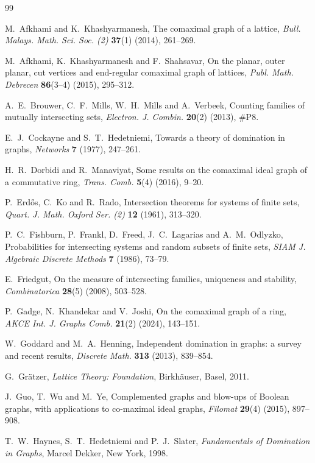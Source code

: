 \documentclass[11pt]{amsart}
\theoremstyle{definition}
\theoremstyle{remark}
\begin{document}
\begin{thebibliography}{99}

 M.~Afkhami and K.~Khashyarmanesh, The comaximal graph of a lattice,
\emph{Bull. Malays. Math. Sci. Soc. (2)} \textbf{37}(1) (2014), 261--269.

 M.~Afkhami, K.~Khashyarmanesh and F.~Shahsavar, On the planar, outer planar, cut
vertices and end-regular comaximal graph of lattices, \emph{Publ. Math. Debrecen} \textbf{86}(3--4)
(2015), 295--312.

 A.~E.~Brouwer, C.~F.~Mills, W.~H.~Mills and A.~Verbeek, Counting families of
mutually intersecting sets, \emph{Electron. J. Combin.} \textbf{20}(2) (2013), \#P8.

 E.~J.~Cockayne and S.~T.~Hedetniemi, Towards a theory of domination in graphs,
\emph{Networks} \textbf{7} (1977), 247--261.

 H.~R.~Dorbidi and R.~Manaviyat, Some results on the comaximal ideal graph of a
commutative ring, \emph{Trans. Comb.} \textbf{5}(4) (2016), 9--20.

 P.~Erd\H{o}s, C.~Ko and R.~Rado, Intersection theorems for systems of finite sets,
\emph{Quart. J. Math. Oxford Ser. (2)} \textbf{12} (1961), 313--320.

 P.~C.~Fishburn, P.~Frankl, D.~Freed, J.~C.~Lagarias and A.~M.~Odlyzko,
Probabilities for intersecting systems and random subsets of finite sets, \emph{SIAM J. Algebraic
Discrete Methods} \textbf{7} (1986), 73--79.

 E.~Friedgut, On the measure of intersecting families, uniqueness and stability,
\emph{Combinatorica} \textbf{28}(5) (2008), 503--528.

 P.~Gadge, N.~Khandekar and V.~Joshi, On the comaximal graph of a ring,
\emph{AKCE Int. J. Graphs Comb.} \textbf{21}(2) (2024), 143--151.

 W.~Goddard and M.~A.~Henning, Independent domination in graphs: a survey and recent
results, \emph{Discrete Math.} \textbf{313} (2013), 839--854.

 G.~Gr\"atzer, \emph{Lattice Theory: Foundation}, Birkh\"auser, Basel, 2011.

 J.~Guo, T.~Wu and M.~Ye, Complemented graphs and blow-ups of Boolean graphs, with
applications to co-maximal ideal graphs, \emph{Filomat} \textbf{29}(4) (2015), 897--908.

 T.~W.~Haynes, S.~T.~Hedetniemi and P.~J.~Slater, \emph{Fundamentals of Domination
in Graphs}, Marcel Dekker, New York, 1998.


\end{thebibliography}
\end{document}
